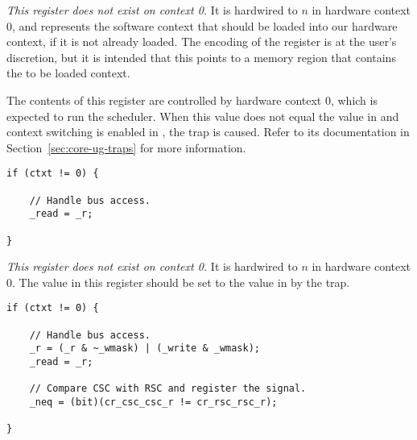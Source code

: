 
\emph{This register does not exist on context 0.} It is hardwired to
$n$ in hardware context 0, and represents the software context that
should be loaded into our hardware context, if it is not already loaded. The
encoding of the register is at the user's discretion, but it is intended that
this points to a memory region that contains the to be loaded context.

The contents of this register are controlled by hardware context 0, which is 
expected to run the scheduler. When this value does not equal the value in 
 and context switching is enabled in , the 
 trap is caused. Refer to its documentation in
Section~\ref{sec:core-ug-traps} for more information.

\declaration{}
\implementation{}
\begin{lstlisting}
if (ctxt != 0) {
    
    // Handle bus access.
    _read = _r;
    
}
\end{lstlisting}


\emph{This register does not exist on context 0.} It is hardwired to
$n$ in hardware context 0. The value in this register should be set
to the value in  by the  trap.

\declaration{}
\implementation{}
\begin{lstlisting}
if (ctxt != 0) {
    
    // Handle bus access.
    _r = (_r & ~_wmask) | (_write & _wmask);
    _read = _r;
    
    // Compare CSC with RSC and register the signal.
    _neq = (bit)(cr_csc_csc_r != cr_rsc_rsc_r);
    
}
\end{lstlisting} %


